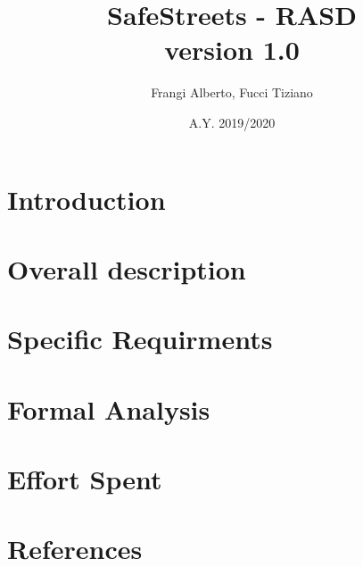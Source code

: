\documentclass[12pt,a4paper]{report}
\title{SafeStreets - RASD \\ \large version 1.0}
\author{Frangi Alberto, Fucci Tiziano}
\date{A.Y. 2019/2020}
\begin{document}
\maketitle
\chapter{Introduction}
\chapter{Overall description}
\chapter{Specific Requirments}
\chapter{Formal Analysis}
\chapter{Effort Spent}
\chapter{References}
\end{document}
